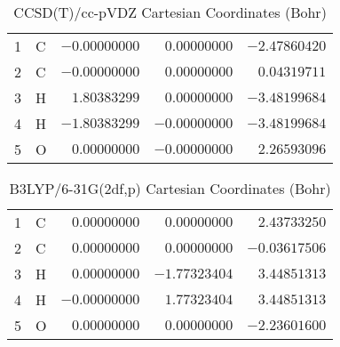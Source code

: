 \documentclass[10pt,oneside]{article}
\begin{document}
\begin{table}[h!]
\centering
\caption{CCSD(T)/cc-pVDZ Cartesian Coordinates (Bohr)}
\begin{tabular}{llrrr}
1  & C  & $-0.00000000$ & $ 0.00000000$ & $-2.47860420$ \\
2  & C  & $-0.00000000$ & $ 0.00000000$ & $ 0.04319711$ \\
3  & H  & $ 1.80383299$ & $ 0.00000000$ & $-3.48199684$ \\
4  & H  & $-1.80383299$ & $-0.00000000$ & $-3.48199684$ \\
5  & O  & $ 0.00000000$ & $-0.00000000$ & $ 2.26593096$ \\
\end{tabular}
\end{table}

\begin{table}[h!]
\centering
\caption{B3LYP/6-31G(2df,p) Cartesian Coordinates (Bohr)}
\begin{tabular}{llrrr}
1  & C  & $ 0.00000000$ & $ 0.00000000$ & $ 2.43733250$ \\
2  & C  & $ 0.00000000$ & $ 0.00000000$ & $-0.03617506$ \\
3  & H  & $ 0.00000000$ & $-1.77323404$ & $ 3.44851313$ \\
4  & H  & $-0.00000000$ & $ 1.77323404$ & $ 3.44851313$ \\
5  & O  & $ 0.00000000$ & $ 0.00000000$ & $-2.23601600$ \\
\end{tabular}
\end{table}

\clearpage
\end{document}
